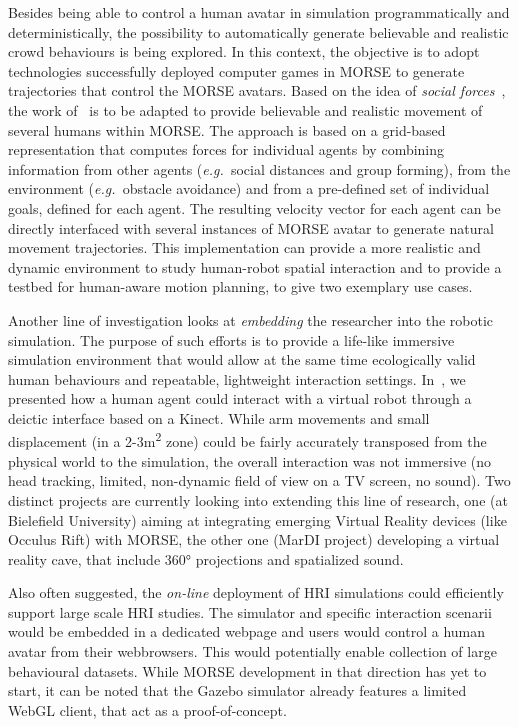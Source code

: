 \documentclass[conference]{IEEEtran}
\newcommand{\eg}{{\textit{e.g.~}}}
\begin{document}
Besides being able to control a human avatar in simulation programmatically and
deterministically, the possibility to automatically generate believable and
realistic crowd behaviours is being explored. In this context, the objective is
to adopt technologies successfully deployed computer games in MORSE to generate
trajectories that control the MORSE avatars.  Based on the idea of \emph{social
forces}~\cite{helbing2001}, the work of~\cite{Szymanezyk2012crowd} is to be
adapted to provide believable and realistic movement of several humans within
MORSE. The approach is based on a grid-based representation that computes forces
for individual agents by combining information from other agents (\eg social
distances and group forming), from the environment (\eg obstacle avoidance) and
from a pre-defined set of individual goals, defined for each agent. The
resulting velocity vector for each agent can be directly interfaced with several
instances of MORSE avatar to generate natural movement trajectories. This
implementation can provide a more realistic and dynamic environment to study
human-robot spatial interaction and to provide a testbed for human-aware motion
planning, to give two exemplary use cases.

Another line of investigation looks at \emph{embedding} the researcher into the robotic
simulation. The purpose of such efforts is to provide a life-like immersive
simulation environment that would allow at the same time ecologically valid
human behaviours and repeatable, lightweight interaction settings.
In~\cite{lemaignan2012morse}, we presented how a human agent could interact with
a virtual robot through a deictic interface based on a Kinect. While arm
movements and small displacement (in a 2-3m\textsuperscript{2} zone) could be fairly
accurately transposed from the physical world to the simulation, the overall
interaction was not immersive (no head tracking, limited, non-dynamic field of
view on a TV screen, no sound). Two distinct projects are currently looking into
extending this line of research, one (at Bielefield University) aiming at
integrating emerging Virtual Reality devices (like Occulus Rift) with MORSE, the
other one (MarDI project) developing a virtual reality cave, that include 360°
projections and spatialized sound.

Also often suggested, the \emph{on-line} deployment of HRI simulations could
efficiently support large scale HRI studies. The simulator and specific
interaction scenarii would be embedded in a dedicated webpage and users would
control a human avatar from their webbrowsers. This would potentially enable
collection of large behavioural datasets. While MORSE development in that
direction has yet to start, it can be noted that the Gazebo simulator already
features a limited WebGL client, that act as a proof-of-concept.
\end{document}
